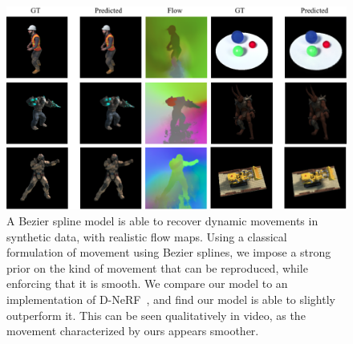 \documentclass[10pt,twocolumn,letterpaper]{article}
\begin{document}
\begin{figure}
    \centering
    \includegraphics[width=\textwidth]{teaser}
    \caption{
    \label{fig:intro_figure}
    A Bezier spline model is able to recover dynamic movements in synthetic data, with realistic flow maps. Using a classical formulation of movement using Bezier splines, we impose a strong prior on the kind of movement that can be reproduced, while enforcing that it is smooth. We compare our model to an implementation of D-NeRF~\cite{pumarola2020dnerf}, and find our model is able to slightly outperform it. This can be seen qualitatively in video, as the movement characterized by ours appears smoother.
    }
\end{figure}








{\small
    
    
}
\end{document}
